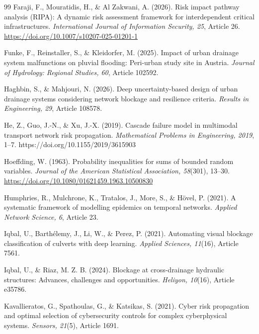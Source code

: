 \begin{thebibliography}{99}
Faraji, F., Mouratidis, H., \& Al Zakwani, A. (2026). Risk impact pathway analysis (RIPA): A dynamic risk assessment framework for interdependent critical infrastructures. \textit{International Journal of Information Security, 25}, Article 26. \url{https://doi.org/10.1007/s10207-025-01201-1}

Funke, F., Reinstaller, S., \& Kleidorfer, M. (2025). Impact of urban drainage system malfunctions on pluvial flooding: Peri-urban study site in Austria. \textit{Journal of Hydrology: Regional Studies, 60}, Article 102592.

Haghbin, S., \& Mahjouri, N. (2026). Deep uncertainty-based design of urban drainage systems considering network blockage and resilience criteria. \textit{Results in Engineering, 29}, Article 108578.

He, Z., Guo, J.-N., \& Xu, J.-X. (2019). Cascade failure model in multimodal transport network risk propagation. \textit{Mathematical Problems in Engineering, 2019}, 1--7. https://doi.org/10.1155/2019/3615903

Hoeffding, W. (1963). Probability inequalities for sums of bounded random variables. \textit{Journal of the American Statistical Association, 58}(301), 13--30. \url{https://doi.org/10.1080/01621459.1963.10500830}

Humphries, R., Mulchrone, K., Tratalos, J., More, S., \& H\"ovel, P. (2021). A systematic framework of modelling epidemics on temporal networks. \textit{Applied Network Science, 6}, Article 23.

Iqbal, U., Barth{\'e}lemy, J., Li, W., \& Perez, P. (2021). Automating visual blockage classification of culverts with deep learning. \textit{Applied Sciences, 11}(16), Article 7561.

Iqbal, U., \& Riaz, M. Z. B. (2024). Blockage at cross-drainage hydraulic structures: Advances, challenges and opportunities. \textit{Heliyon, 10}(16), Article e35786.

Kavallieratos, G., Spathoulas, G., \& Katsikas, S. (2021). Cyber risk propagation and optimal selection of cybersecurity controls for complex cyberphysical systems. \textit{Sensors, 21}(5), Article 1691.


\end{thebibliography}
